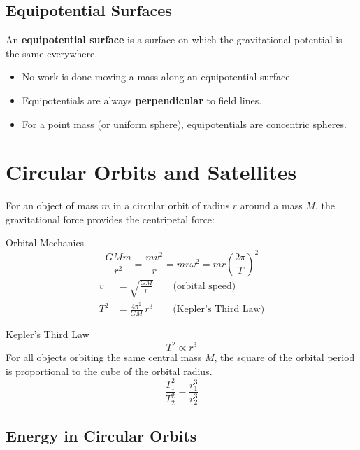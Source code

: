 \subsection{Equipotential Surfaces}

An \textbf{equipotential surface} is a surface on which the gravitational potential
is the same everywhere.
\begin{itemize}
  \item No work is done moving a mass along an equipotential surface.
  \item Equipotentials are always \textbf{perpendicular} to field lines.
  \item For a point mass (or uniform sphere), equipotentials are concentric spheres.
\end{itemize}

\section{Circular Orbits and Satellites}

For an object of mass $m$ in a circular orbit of radius $r$ around a mass $M$, the
gravitational force provides the centripetal force:

\begin{formulabox}{Orbital Mechanics}
\begin{equation}
  \frac{GMm}{r^2} = \frac{mv^2}{r} = mr\omega^2 = mr\left(\frac{2\pi}{T}\right)^2
\end{equation}
\begin{align}
  v &= \sqrt{\frac{GM}{r}} \qquad \text{(orbital speed)} \\[6pt]
  T^2 &= \frac{4\pi^2}{GM}\,r^3 \qquad \text{(Kepler's Third Law)}
\end{align}
\end{formulabox}

\begin{formulabox}{Kepler's Third Law}
\begin{equation}
  T^2 \propto r^3
\end{equation}
For all objects orbiting the same central mass $M$, the square of the orbital period
is proportional to the cube of the orbital radius.
\[
  \frac{T_1^2}{T_2^2} = \frac{r_1^3}{r_2^3}
\]
\end{formulabox}

\subsection{Energy in Circular Orbits}

